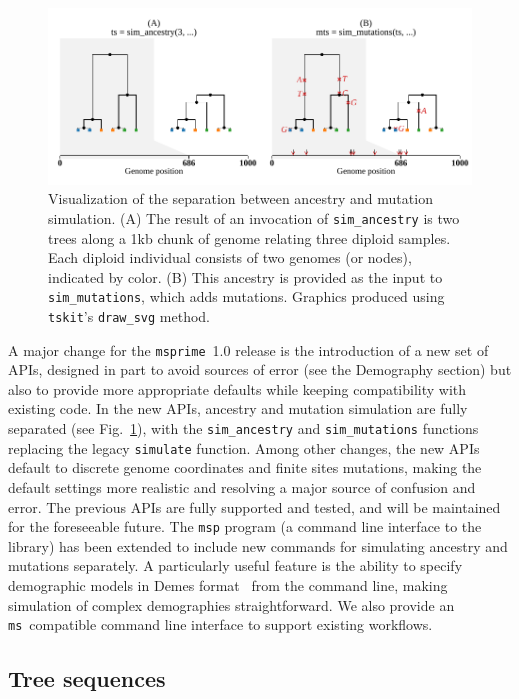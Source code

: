 \documentclass[9pt,twocolumn,twoside,lineno]{gsajnl}
\newcommand{\msprime}[0]{\texttt{msprime}}
\newcommand{\tskit}[0]{\texttt{tskit}}
\newcommand{\ms}[0]{\texttt{ms}}
\begin{document}
\begin{figure}
    \includegraphics{illustrations/mutated_tree}
    \caption{
        \label{fig-mutated-trees}
        Visualization of the separation between ancestry and mutation
        simulation. (A) The result of an invocation of \texttt{sim\_ancestry}
        is two trees along a 1kb chunk of genome relating three diploid samples.
        Each diploid individual consists of two genomes (or nodes), indicated
        by color.
        (B) This ancestry is provided as the input to \texttt{sim\_mutations},
        which adds mutations.
        Graphics produced using \tskit's \texttt{draw\_svg} method.
    }
\end{figure}

A major change for the \msprime\ 1.0 release is the introduction of a new set of APIs,
designed in part to avoid sources of error (see the Demography section) but
also to provide more appropriate defaults while keeping compatibility with
existing code. In the new APIs, ancestry and mutation simulation are fully
separated (see Fig.~\ref{fig-mutated-trees}),
with the \texttt{sim\_ancestry} and \texttt{sim\_mutations}
functions replacing the legacy \texttt{simulate} function. Among other changes,
the new APIs default to discrete genome coordinates and finite sites mutations,
making the default settings more realistic and resolving a major source of confusion and error.
The previous APIs are fully
supported and tested, and will be maintained for the foreseeable future.
The \texttt{msp} program (a command line interface to the library)
has been extended to include new commands
for simulating ancestry and mutations separately. A particularly useful
feature is the ability to specify demographic models in
Demes format~\citep{gower2021demes} from the command line,
making simulation of complex demographies straightforward.
We also provide an \ms\ compatible
command line interface to support existing workflows.

\subsection*{Tree sequences}
\label{sec-ts}
\end{document}
